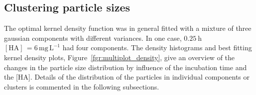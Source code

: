 \documentclass[journal=langd5,manuscript=article]{achemso}
\begin{document}
\subsection{Clustering particle sizes}



The optimal  kernel density function was in general fitted with a mixture of three gaussian components with different variances.
In one case,
$0.25~\mathrm{h}$
$\mathrm{[HA]\, = 6\, mg\,L^{-1}}$ had four components. The density histograms and best fitting  kernel density plots,
Figure~\ref{fgr:multiplot_density},
give an overview  of the changes in the particle size distribution by influence of the 
incubation time and the [HA]. 
Details of the distribution of the particles in  individual components or clusters is commented in the following subsections.
\end{document}
